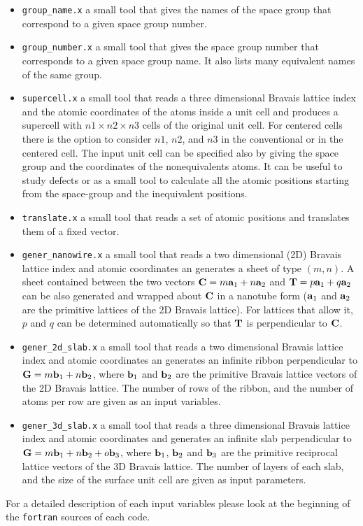 \documentclass[12pt,a4paper]{article}
\begin{document}
\begin{itemize}

\item \texttt{group\_name.x} a small tool that gives the names of the 
space group that correspond to a given space group number. 

\item \texttt{group\_number.x} a small tool that gives the space group number
that corresponds to a given space group name. It also lists many equivalent
names of the same group.

\item \texttt{supercell.x} a small tool that reads a three dimensional
Bravais lattice index and the atomic coordinates of the atoms inside a unit
cell and produces a supercell with $n1 \times n2 \times n3$ cells of the original
unit cell. For centered cells there is the option to consider $n1$, $n2$,
and $n3$ in the conventional or in the centered cell.
The input unit cell can be specified also by giving the space group and
the coordinates of the nonequivalents atoms.
It can be useful to study defects or as a small tool to calculate all the 
atomic positions starting from the space-group and the 
inequivalent positions.

\item \texttt{translate.x} a small tool that reads a set of atomic positions
and translates them of a fixed vector.

\item \texttt{gener\_nanowire.x} a small tool that reads a two dimensional (2D)
Bravais lattice index and atomic coordinates an generates a sheet of type
$(m,n)$. A sheet contained between the two vectors 
${\bf C} = m {\bf a}_1 + n {\bf a}_2$ and ${\bf T} = p {\bf a}_1 + q {\bf a}_2$
can be also generated and wrapped about ${\bf C}$ in a nanotube form 
(${\bf a}_1$ and ${\bf a}_2$ are the primitive lattices of the 2D Bravais 
lattice). 
For lattices that allow it, $p$ and $q$ can be determined automatically so that 
${\bf T}$ is perpendicular to ${\bf C}$.

\item \texttt{gener\_2d\_slab.x} a small tool that reads a two dimensional 
Bravais lattice index and atomic coordinates an generates an infinite ribbon
perpendicular to ${\bf G} = m {\bf b}_1 + n {\bf b}_2$, where 
${\bf b}_1$ and ${\bf b}_2$ are the primitive Bravais lattice vectors 
of the 2D Bravais lattice. The number of rows of the ribbon, and the number of
atoms per row are given as an input variables.

\item \texttt{gener\_3d\_slab.x} a small tool that reads a three dimensional
Bravais lattice index and atomic coordinates and generates an infinite slab
perpendicular to ${\bf G} = m {\bf b}_1 + n {\bf b}_2 + o {\bf b}_3$, where
${\bf b}_1$, ${\bf b}_2$ and ${\bf b}_3$ are the primitive reciprocal lattice
vectors of the 3D Bravais lattice. The number of layers of each slab, and the
size of the surface unit cell are given as input parameters.

\end{itemize}

For a detailed description of each input variables please look at the beginning 
of the \texttt{fortran} sources of each code.
\end{document}
